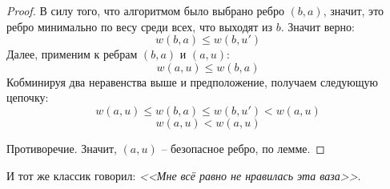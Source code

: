 \begin{proof}
    В силу того, что алгоритмом было выбрано ребро $(b, a)$, значит, это ребро минимально по весу среди всех, что выходят из $b$. Значит верно:
    \begin{equation*}
        w(b, a) \leq w(b, u')
    \end{equation*}
    Далее, применим  к ребрам $(b, a)$ и $(a, u)$:
    \begin{equation*}
        w(a, u) \leq w(b, a)
    \end{equation*}
    Кобминируя два неравенства выше и предположение, получаем следующую цепочку:
    \begin{equation*}
        w(a, u) \leq w(b, a) \leq w(b, u') < w(a, u)
    \end{equation*}
    \begin{equation*}
        w(a, u) < w(a, u)
    \end{equation*}

    Противоречие. Значит, $(a, u)$ -- безопасное ребро, по лемме.

\end{proof}

И тот же классик говорил: \textit{<<Мне всё равно не нравилась эта ваза>>}.


